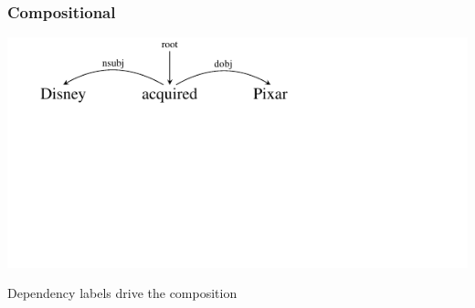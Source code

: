 \documentclass[mathserif,12pt]{beamer}
\begin{document}
\begin{frame}
\frametitle{Compositional}
\begin{center}
\vspace{-5em}
\includegraphics[trim=2em 9.4em 10em 0em,clip=true,scale=1.3]{figures/pixar}

\vspace{2cm}
\begin{block}{}
\centering
Dependency labels drive the composition
\end{block}
\end{center}
\end{frame}
\end{document}
